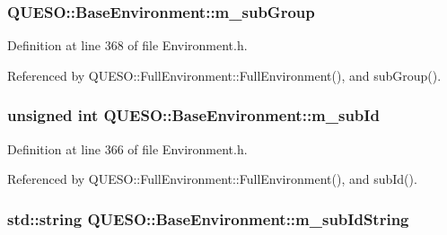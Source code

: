 \hypertarget{class_q_u_e_s_o_1_1_base_environment_a6669dac8fb884d4eb3278625f0e8d661}{
\subsubsection[{m\-\_\-sub\-Group}]{ Q\-U\-E\-S\-O\-::\-Base\-Environment\-::m\-\_\-sub\-Group\hspace{0.3cm}{\ttfamily [protected]}}}\label{class_q_u_e_s_o_1_1_base_environment_a6669dac8fb884d4eb3278625f0e8d661}


Definition at line 368 of file Environment.\-h.



Referenced by Q\-U\-E\-S\-O\-::\-Full\-Environment\-::\-Full\-Environment(), and sub\-Group().

\hypertarget{class_q_u_e_s_o_1_1_base_environment_a2aea4a26ea39e72300f7c32594c26012}{
\subsubsection[{m\-\_\-sub\-Id}]{\setlength{\rightskip}{0pt plus 5cm}unsigned int Q\-U\-E\-S\-O\-::\-Base\-Environment\-::m\-\_\-sub\-Id\hspace{0.3cm}{\ttfamily [protected]}}}\label{class_q_u_e_s_o_1_1_base_environment_a2aea4a26ea39e72300f7c32594c26012}


Definition at line 366 of file Environment.\-h.



Referenced by Q\-U\-E\-S\-O\-::\-Full\-Environment\-::\-Full\-Environment(), and sub\-Id().

\hypertarget{class_q_u_e_s_o_1_1_base_environment_a19243150a58181cbdaf58b1bacd90009}{
\subsubsection[{m\-\_\-sub\-Id\-String}]{\setlength{\rightskip}{0pt plus 5cm}std\-::string Q\-U\-E\-S\-O\-::\-Base\-Environment\-::m\-\_\-sub\-Id\-String\hspace{0.3cm}{\ttfamily [protected]}}}\label{class_q_u_e_s_o_1_1_base_environment_a19243150a58181cbdaf58b1bacd90009}


